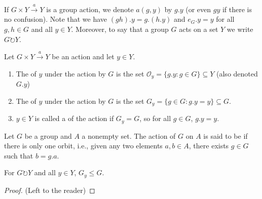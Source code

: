 \begin{nota} 
        If $G\times Y\xrightarrow{a}Y$ is a group action, we denote $a(g,y)$ by $g.y$ (or even $gy$ if there is no confusion). Note that we have $(gh).y = g.(h.y)$ and $e_G.y = y$ for all $g,h \in G$ and all $y \in Y$. Moreover, to say that a group $G$ acts on a set $Y$ we write $G \circlearrowright Y$.
\end{nota}


\begin{defn}
        Let $G\times Y \xrightarrow{a} Y$ be an action and let $y \in Y$. \begin{enumerate}
                \item The  of $y$ under the action by $G$ is the set $\mathcal{O}_y = \{g.y:g\in G\}\subseteq Y$ (also denoted $G.y$)
                \item The  of $y$ under the action by $G$ is the set $G_y = \{g\in G:g.y = y\}\subseteq G$.
                \item $y \in Y$ is called a  of the action if $G_y = G$, so for all $g \in G$, $g.y = y$.
        \end{enumerate}
\end{defn}

\begin{defn}
    Let $G$ be a group and $A$ a nonempty set. The action of $G$ on $A$ is said to be  if there is only one orbit, i.e., given any two elements $a,b \in A$, there exists $g \in G$ such that $b = g.a$.
\end{defn}



\begin{prop}
        For $G \circlearrowright Y$ and all $y \in Y$, $G_y \leq G$.
\end{prop}
\begin{proof}
        (Left to the reader)
\end{proof}


